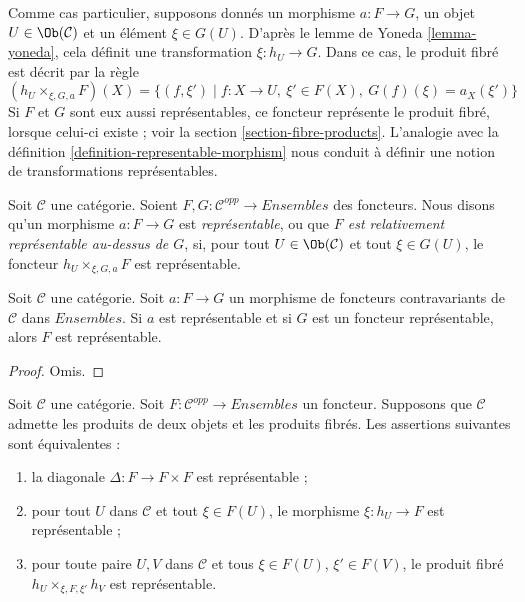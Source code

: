 \noindent
Comme cas particulier, supposons donnés un morphisme
$a : F \to G$, un objet $U \in \Ob(\mathcal{C})$
et un élément $\xi \in G(U)$. D'après le
lemme de Yoneda \ref{lemma-yoneda}, cela définit une transformation
$\xi : h_U \to G$. Dans ce cas, le produit fibré est décrit par la règle
$$
(h_U \times_{\xi, G, a} F)(X) =
\{ (f, \xi') \mid f : X \to U, \ \xi' \in F(X), \ G(f)(\xi) = a_X(\xi')\}
$$
Si $F$ et $G$ sont eux aussi représentables, ce foncteur représente le
produit fibré, lorsque celui-ci existe ; voir la
section \ref{section-fibre-products}.
L'analogie avec la définition \ref{definition-representable-morphism}
nous conduit à définir une notion de transformations représentables.

\begin{definition}
\label{definition-representable-map-presheaves}
Soit $\mathcal{C}$ une catégorie.
Soient $F, G : \mathcal{C}^{opp} \to \textit{Ensembles}$
des foncteurs. Nous disons qu'un morphisme $a : F \to G$ est
{\it représentable}, ou que {\it $F$ est relativement représentable
au-dessus de $G$}, si, pour tout $U \in \Ob(\mathcal{C})$
et tout $\xi \in G(U)$, le foncteur
$h_U \times_{\xi, G, a} F$ est représentable.
\end{definition}

\begin{lemma}
\label{lemma-representable-over-representable}
Soit $\mathcal{C}$ une catégorie.
Soit $a : F \to G$ un morphisme de foncteurs contravariants
de $\mathcal{C}$ dans $\textit{Ensembles}$. Si $a$ est représentable
et si $G$ est un foncteur représentable, alors $F$ est représentable.
\end{lemma}

\begin{proof}
Omis.
\end{proof}

\begin{lemma}
\label{lemma-representable-diagonal}
Soit $\mathcal{C}$ une catégorie.
Soit $F : \mathcal{C}^{opp} \to \textit{Ensembles}$ un foncteur.
Supposons que $\mathcal{C}$ admette les produits de deux objets et les
produits fibrés. Les assertions suivantes sont équivalentes :
\begin{enumerate}
\item la diagonale $\Delta : F \to F \times F$ est représentable ;
\item pour tout $U$ dans $\mathcal{C}$
et tout $\xi \in F(U)$, le morphisme $\xi : h_U \to F$ est représentable ;
\item pour toute paire $U, V$ dans $\mathcal{C}$
et tous $\xi \in F(U)$, $\xi' \in F(V)$, le produit fibré
$h_U \times_{\xi, F, \xi'} h_V$ est représentable.
\end{enumerate}
\end{lemma}

